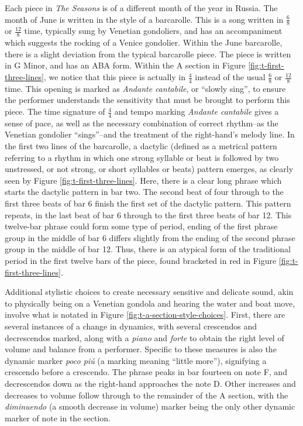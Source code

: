 Each piece in \textit{The Seasons} is of a different month of the year in Russia. The month of June is written in the style of a barcarolle. This is a song written in $\frac{6}{8}$ or $\frac{12}{8}$ time, typically sung by Venetian gondoliers, and has an accompaniment which suggests the rocking of a Venice gondolier\autocite{Latham_2011b}. Within the June barcarolle, there is a slight deviation from the typical barcarolle piece. The piece is written in G Minor, and has an ABA form. Within the A section in Figure \ref{fig:t-first-three-lines}, we notice that this piece is actually in $\frac{4}{4}$ instead of the usual $\frac{6}{8}$ or $\frac{12}{8}$ time. This opening is marked as \textit{Andante cantabile}, or ``slowly sing'', to ensure the performer understands the sensitivity that must be brought to perform this piece. The time signature of $\frac{4}{4}$ and tempo marking \textit{Andante cantabile} gives a sense of pace, as well as the necessary combination of correct rhythm--as the Venetian gondolier ``sings''--and the treatment of the right-hand's melody line. In the first two lines of the barcarolle, a dactylic (defined as a metrical pattern referring to a rhythm in which one strong syllable or beat is followed by two unstressed, or not strong, or short syllables or beats)\autocite{Cambridge_University_Press_Assessment} pattern emerges, as clearly seen by Figure \ref{fig:t-first-three-lines}\autocite{Henle_2002}. Here, there is a clear long phrase which starts the dactylic pattern in bar two. The second beat of four through to the first three beats of bar 6 finish the first set of the dactylic pattern. This pattern repeats, in the last beat of bar 6 through to the first three beats of bar 12. This twelve-bar phrase could form some type of period, ending of the first phrase group in the middle of bar 6 differs slightly from the ending of the second phrase group in the middle of bar 12. Thus, there is an atypical form of the traditional period in the first twelve bars of the piece, found bracketed in red in Figure \ref{fig:t-first-three-lines}\autocite{Henle_2002}. 

Additional stylistic choices to create necessary sensitive and delicate sound, akin to physically being on a Venetian gondola and hearing the water and boat move, involve what is notated in Figure \ref{fig:t-a-section-style-choices}\autocite{Henle_2002}. First, there are several instances of a change in dynamics, with several crescendos and decrescendos marked, along with a \textit{piano} and \textit{forte} to obtain the right level of volume and balance from a performer. Specific to these measures is also the dynamic marker \textit{poco piú} (a marking meaning ``little more''), signifying a crescendo before a crescendo. The phrase peaks in bar fourteen on note F, and decrescendos down as the right-hand approaches the note D. Other increases and decreases to volume follow through to the remainder of the A section, with the \textit{diminuendo} (a smooth decrease in volume) marker being the only other dynamic marker of note in the section.

